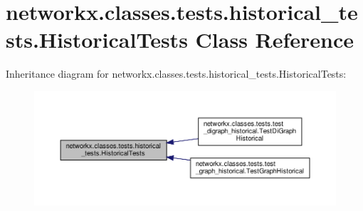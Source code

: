 \hypertarget{classnetworkx_1_1classes_1_1tests_1_1historical__tests_1_1HistoricalTests}{}\section{networkx.\+classes.\+tests.\+historical\+\_\+tests.\+Historical\+Tests Class Reference}
\label{classnetworkx_1_1classes_1_1tests_1_1historical__tests_1_1HistoricalTests}


Inheritance diagram for networkx.\+classes.\+tests.\+historical\+\_\+tests.\+Historical\+Tests\+:
\nopagebreak
\begin{figure}[H]
\begin{center}
\leavevmode
\includegraphics[width=350pt]{classnetworkx_1_1classes_1_1tests_1_1historical__tests_1_1HistoricalTests__inherit__graph}
\end{center}
\end{figure}
